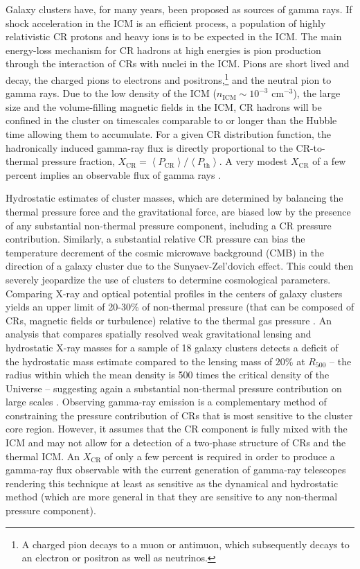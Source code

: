 \documentclass[12pt,manuscript]{aastex}
\newcommand{\expval}[1]{\left\langle #1 \right\rangle}
\newcommand{\CR}{\mathrm{CR}}
\begin{document}
Galaxy clusters have, for many years, been proposed as sources of gamma rays. If shock acceleration
in the ICM is an efficient process, a population of highly relativistic CR protons and heavy ions is
to be expected in the ICM. The main energy-loss mechanism for CR hadrons at high energies is pion
production through the interaction of CRs with nuclei in the ICM. Pions are short lived and decay,
the charged pions to electrons and positrons,\footnote{A charged pion decays to a muon or antimuon,
which subsequently decays to an electron or positron as well as neutrinos.} and the neutral pion to
gamma rays. Due to the low density of the ICM ($n_{\mathrm{ICM}}\sim 10^{-3}$ cm$^{-3}$), the large
size and the volume-filling magnetic fields in the ICM, CR hadrons will be confined in
the cluster on timescales comparable to or longer than the Hubble time
\citep[][]{article:Volk_etal:1996, article:Berezinsky_etal:1997} allowing them to accumulate. For a
given CR distribution function, the hadronically induced gamma-ray flux is directly proportional to
the CR-to-thermal pressure fraction, $X_\CR=\expval{P_{\CR}}/ \expval{P_{\mathrm{th}}}$. A very
modest $X_{\CR}$ of a few percent implies an observable flux of gamma rays
\citep[e.g.,][]{article:PfrommerEnsslin:2004b}.

Hydrostatic estimates of cluster masses, which are determined by balancing the thermal pressure
force and the gravitational force, are biased low by the presence of any substantial non-thermal
pressure component, including a CR pressure contribution. Similarly, a substantial relative CR
pressure can bias the temperature decrement of the cosmic microwave background (CMB) in the
direction of a galaxy cluster due to the Sunyaev-Zel'dovich effect. This could then severely
jeopardize the use of clusters to determine cosmological parameters. Comparing X-ray and optical
potential profiles in the centers of galaxy clusters yields an upper limit of 20-30\% of non-thermal
pressure (that can be composed of CRs, magnetic fields or turbulence) relative to the thermal gas
pressure \citep{article:Churazov_etal:2008, article:Churazov_etal:2010}. An analysis that compares
spatially resolved weak gravitational lensing and hydrostatic X-ray masses for a sample of 18 galaxy
clusters detects a deficit of the hydrostatic mass estimate compared to the lensing mass of $20\%$
at $R_{500}$ -- the radius within which the mean density is 500 times the critical density of the
Universe -- suggesting again a substantial non-thermal pressure contribution on large scales
\citep{article:Mahdavi_etal:2008}. Observing gamma-ray emission is a complementary method of
constraining the pressure contribution of CRs that is most sensitive to the cluster core
region. However, it assumes that the CR component is fully mixed with the ICM and may not allow for
a detection of a two-phase structure of CRs and the thermal ICM. An $X_\CR$ of only a few percent is
required in order to produce a gamma-ray flux observable with the current generation of gamma-ray
telescopes rendering this technique at least as sensitive as the dynamical and hydrostatic method
(which are more general in that they are sensitive to any non-thermal pressure component).
\end{document}
